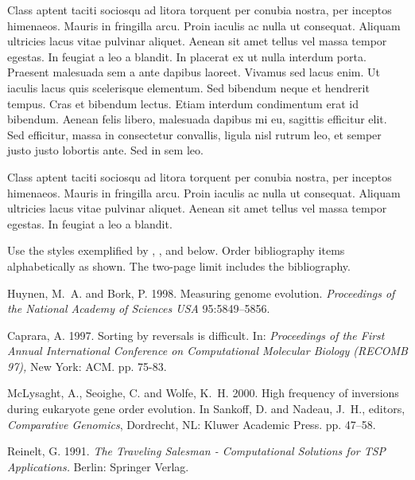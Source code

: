 \documentclass{article}
\begin{document}
\vspace{5mm}
Class aptent taciti sociosqu ad litora torquent per conubia nostra, per inceptos himenaeos. Mauris in fringilla arcu. Proin iaculis ac nulla ut consequat. Aliquam ultricies lacus vitae pulvinar aliquet. Aenean sit amet tellus vel massa tempor egestas. In feugiat a leo a blandit. In placerat ex ut nulla interdum porta. Praesent malesuada sem a ante dapibus laoreet. Vivamus sed lacus enim. Ut iaculis lacus quis scelerisque elementum. Sed bibendum neque et hendrerit tempus. Cras et bibendum lectus. Etiam interdum condimentum erat id bibendum. Aenean felis libero, malesuada dapibus mi eu, sagittis efficitur elit. Sed efficitur, massa in consectetur convallis, ligula nisl rutrum leo, et semper justo justo lobortis ante. Sed in sem leo.

\vspace{5mm}
Class aptent taciti sociosqu ad litora torquent per conubia nostra, per inceptos himenaeos. Mauris in fringilla arcu. Proin iaculis ac nulla ut consequat. Aliquam ultricies lacus vitae pulvinar aliquet. Aenean sit amet tellus vel massa tempor egestas. In feugiat a leo a blandit. 



Use the styles exemplified by \cite{HB98}, \cite{CA}, \cite{MSW00} and
\cite{Rei91} below.  Order bibliography items alphabetically as shown.  The
two-page limit includes the bibliography.


\footnotesize

\begin{thebibliography}{99}

 Huynen, M.~A. and Bork, P. 1998. Measuring genome evolution. {\em
Proceedings of the National Academy of Sciences USA}
  95:5849--5856.

 Caprara, A. 1997. Sorting by reversals is difficult. In: {\em
Proceedings of the First Annual International Conference on Computational
Molecular Biology (RECOMB 97),} New York: ACM.  pp. 75-83.

McLysaght, A., Seoighe, C. and Wolfe, K.~H. 2000. High frequency
of inversions during eukaryote gene order evolution.     In Sankoff, D. and
Nadeau, J.~H., editors, {\em Comparative Genomics},  Dordrecht, NL: Kluwer
Academic Press. pp. 47--58.

 Reinelt, G. 1991. {\em The Traveling Salesman - Computational
Solutions for TSP Applications.} Berlin: Springer Verlag.

\end{thebibliography}
\end{document}
